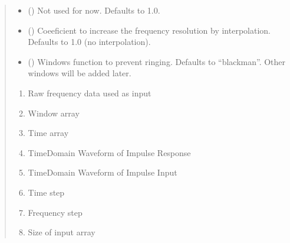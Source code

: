 \documentclass[letterpaper,10pt,english]{sphinxmanual}
\begin{document}
\begin{fulllineitems}
\begin{fulllineitems}
\begin{quote}
\begin{description}
\begin{itemize}
\item {}
\sphinxAtStartPar
{} (\sphinxstyleliteralemphasis{\sphinxupquote{, }}) \textendash{} Not used for now. Defaults to 1.0.

\item {}
\sphinxAtStartPar
{} (\sphinxstyleliteralemphasis{\sphinxupquote{, }}) \textendash{} Coeeficient to increase the frequency resolution by interpolation. Defaults to 1.0 (no interpolation).

\item {}
\sphinxAtStartPar
{} (\sphinxstyleliteralemphasis{\sphinxupquote{, }}) \textendash{} Windows function to prevent ringing. Defaults to “blackman”. Other windows will be added later.

\end{itemize}

\sphinxAtStartPar
\begin{description}
\begin{enumerate}
%
\item {}
\sphinxAtStartPar
Raw frequency data used as input

\item {}
\sphinxAtStartPar
Window array

\item {}
\sphinxAtStartPar
Time array

\item {}
\sphinxAtStartPar
Time\sphinxhyphen{}Domain Waveform of Impulse Response

\item {}
\sphinxAtStartPar
Time\sphinxhyphen{}Domain Waveform of Impulse Input

\item {}
\sphinxAtStartPar
Time step

\item {}
\sphinxAtStartPar
Frequency step

\item {}
\sphinxAtStartPar
Size of input array


\end{enumerate}
\end{description}
\end{description}
\end{quote}
\end{fulllineitems}
\end{fulllineitems}
\end{document}

